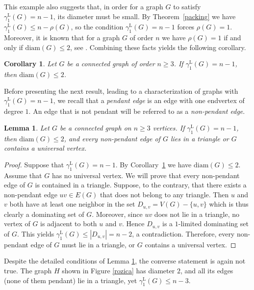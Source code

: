 \documentclass[11pt]{article}
\newtheorem{lemma}[theorem]{Lemma}
\newtheorem{corollary}[theorem]{Corollary}
\newcommand{\gammaenaL}{\gamma_1^{\mathrm L}}
\newcommand{\diam}{\mathrm{diam}}
\begin{document}
This example also suggests that, in order for a graph $G$ to satisfy 
$\gamma^{\mathrm L}_1(G) = n-1$, its diameter must be small. 
By Theorem~\ref{packing} we have $\gamma^{\mathrm L}_1(G)\le n-\rho(G)$, 
so the condition $\gamma^{\mathrm L}_1(G)=n-1$ forces $\rho(G)=1$. 
Moreover, it is known that for a graph $G$ of order $n$ we have 
$\rho(G)=1$ if and only if $\diam(G)\le 2$, see \cite{klimited}. 
Combining these facts yields the following corollary.


\begin{corollary}\label{diameter2}
Let $G$ be a connected graph of order $n\geq 3$. If $\gammaenaL(G)=n-1$, then $\diam(G)\leq 2$.
\end{corollary}

Before presenting the next result, leading to a characterization of graphs with $\gammaenaL(G)=n-1$, we recall that a \emph{pendant edge} is an edge with one endvertex of degree $1$. An edge that is not pendant will be referred to as a \emph{non-pendant edge}. 

\medskip

\begin{lemma}\label{pendant}
Let $G$ be a connected graph on $n\geq 3$ vertices. 
If $\gamma^{\mathrm L}_1(G)=n-1$, then $\mathrm{diam}(G)\le 2$,
and every non-pendant edge of $G$ lies in a triangle or $G$ contains a universal vertex.
\end{lemma}

\begin{proof}
Suppose that $\gammaenaL(G)=n-1$. 
By Corollary~\ref{diameter2} we have $\diam(G)\leq 2$.
Assume that $G$ has no universal vertex. We will prove that every non-pendant edge of $G$ is contained in a triangle. Suppose, to the contrary, that there exists a non-pendant edge $uv \in E(G)$ that does not belong to any triangle. Then $u$ and $v$ both have at least one neighbor in the set $D_{u,v}=V(G)-\{u,v\}$ which is thus clearly a dominating set of $G$. Moreover, since $uv$ does not lie in a triangle, no vertex of $G$ is adjacent to both $u$ and $v$. Hence $D_{u,v}$ is a $1$-limited dominating set of $G$. This yields $\gammaenaL(G) \leq |D_{u,v}| = n - 2$, a contradiction. Therefore, every non-pendant edge of $G$ must lie in a triangle, or $G$ contains a universal vertex.
\end{proof}


Despite the detailed conditions of Lemma \ref{pendant}, the converse statement is again not true. The graph $H$ shown in Figure \ref{rozica} has diameter $2$, and all its edges (none of them pendant) lie in a triangle, yet $\gammaenaL(G)\leq n-3$.
\end{document}
